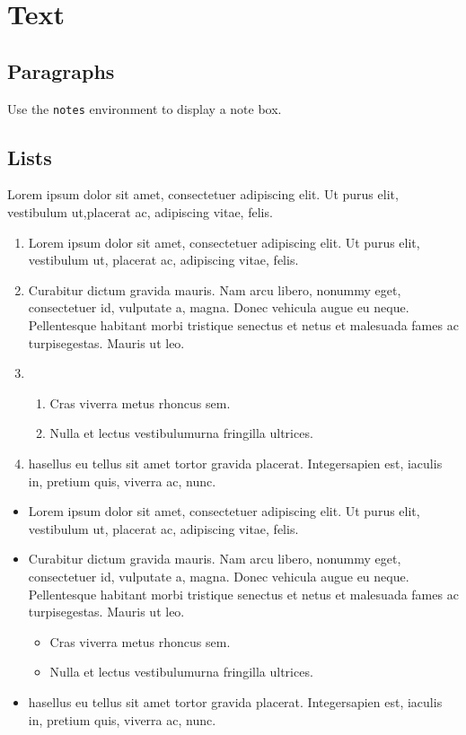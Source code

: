 
\chapter{Text}

\section{Paragraphs}

\lipsum[1-2]

\begin{notes}
    Use the \texttt{notes} environment to display a note box.
\end{notes}

\section{Lists}

Lorem ipsum dolor sit amet, consectetuer adipiscing elit. Ut purus elit, vestibulum ut,placerat ac, adipiscing vitae, felis.

\begin{enumerate}
    \item Lorem ipsum dolor sit amet, consectetuer adipiscing elit. Ut purus elit, vestibulum ut, placerat ac, adipiscing vitae, felis.
    \item Curabitur dictum gravida mauris. Nam arcu libero, nonummy eget, consectetuer id, vulputate a, magna. Donec vehicula augue eu neque. Pellentesque habitant morbi tristique senectus et netus et malesuada fames ac turpisegestas. Mauris ut leo.
    \item \begin{enumerate}
        \item Cras viverra metus rhoncus sem.
        \item Nulla et lectus vestibulumurna fringilla ultrices.
    \end{enumerate}
    \item hasellus eu tellus sit amet tortor gravida placerat. Integersapien est, iaculis in, pretium quis, viverra ac, nunc.
\end{enumerate}

\begin{itemize}
    \item Lorem ipsum dolor sit amet, consectetuer adipiscing elit. Ut purus elit, vestibulum ut, placerat ac, adipiscing vitae, felis.
    \item  Curabitur dictum gravida mauris. Nam arcu libero, nonummy eget, consectetuer id, vulputate a, magna. Donec vehicula augue eu neque. Pellentesque habitant morbi tristique senectus et netus et malesuada fames ac turpisegestas. Mauris ut leo.
    \begin{itemize}
        \item Cras viverra metus rhoncus sem.
        \item Nulla et lectus vestibulumurna fringilla ultrices.
    \end{itemize}
    \item hasellus eu tellus sit amet tortor gravida placerat. Integersapien est, iaculis in, pretium quis, viverra ac, nunc.
\end{itemize}

